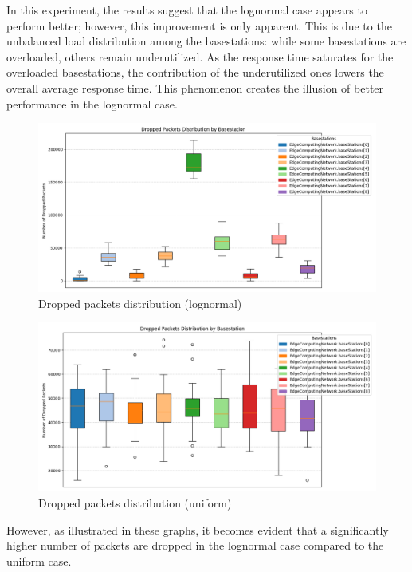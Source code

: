 \documentclass{report}
\begin{document}
In this experiment, the results suggest that the lognormal case appears to perform better; however, this improvement is only apparent.
This is due to the unbalanced load distribution among the basestations: while some basestations are overloaded, others remain underutilized.
As the response time saturates for the overloaded basestations, the contribution of the underutilized ones lowers the overall average response time.
This phenomenon creates the illusion of better performance in the lognormal case.

\begin{figure}[H]
    \centering
    \includegraphics[width=\textwidth]{img/plots/log_1e4_A/dropped.png}
    \caption{Dropped packets distribution (lognormal)}
\end{figure}

\begin{figure}[H]
    \centering
    \includegraphics[width=\textwidth]{img/plots/uni_1e4_A/dropped.png}
    \caption{Dropped packets distribution (uniform)}
\end{figure}

\begin{flushleft}
However, as illustrated in these graphs, it becomes evident that a significantly higher number of packets are dropped in the lognormal case compared to the uniform case.
\end{flushleft}
\end{document}
